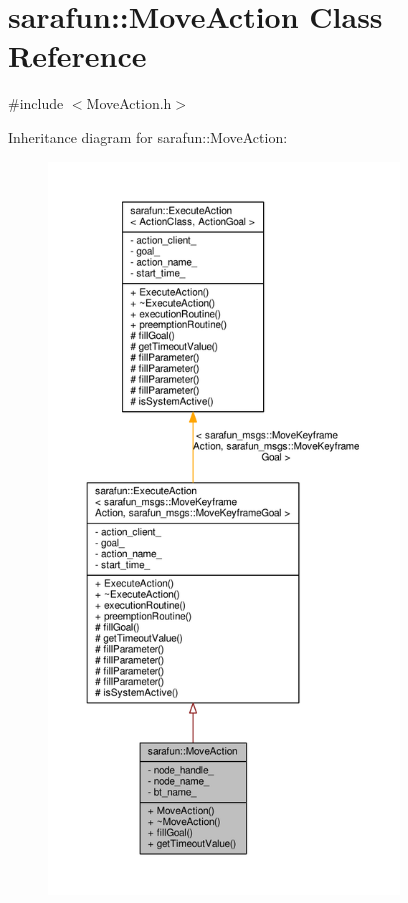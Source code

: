 \hypertarget{classsarafun_1_1MoveAction}{\section{sarafun\-:\-:Move\-Action Class Reference}
\label{classsarafun_1_1MoveAction}
}


{\ttfamily \#include $<$Move\-Action.\-h$>$}



Inheritance diagram for sarafun\-:\-:Move\-Action\-:\nopagebreak
\begin{figure}[H]
\begin{center}
\leavevmode
\includegraphics[height=550pt]{d1/d63/classsarafun_1_1MoveAction__inherit__graph}
\end{center}
\end{figure}


